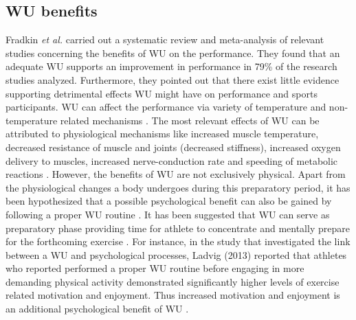 \subsection{WU benefits}
Fradkin \textit{et al.} carried out a systematic review and meta-analysis of relevant studies concerning the benefits of WU on the performance. They found that an adequate WU supports an improvement in performance in 79\% of the research studies analyzed. Furthermore, they pointed out that there exist little evidence supporting detrimental effects WU might have on performance and sports participants.
WU can affect the performance via variety of temperature and non-temperature related mechanisms \cite{bishop2003warm1}. 
The most relevant effects of WU can be attributed to physiological mechanisms like increased muscle temperature, decreased resistance of muscle and joints (decreased stiffness), increased oxygen delivery to muscles, increased nerve-conduction rate and speeding of metabolic reactions \cite{bishop2003warm1}. 
However, the benefits of WU are not exclusively physical. Apart from the physiological changes a body undergoes during this preparatory period, it has been hypothesized that a possible psychological benefit can also be gained by following a proper WU routine \cite{bishop2003warm1,shellock1985warming}.
It has been suggested that WU can serve as preparatory phase providing time for athlete to concentrate and mentally prepare for the forthcoming exercise \cite{shellock1985warming}. 
For instance, in the study that investigated the link between a WU and psychological processes, Ladvig (2013) reported that athletes who reported performed a proper WU routine before engaging in more demanding physical activity demonstrated significantly higher levels of exercise related motivation and enjoyment. Thus increased motivation and enjoyment is an additional psychological benefit of WU \cite{ladwig2013psychological}.
